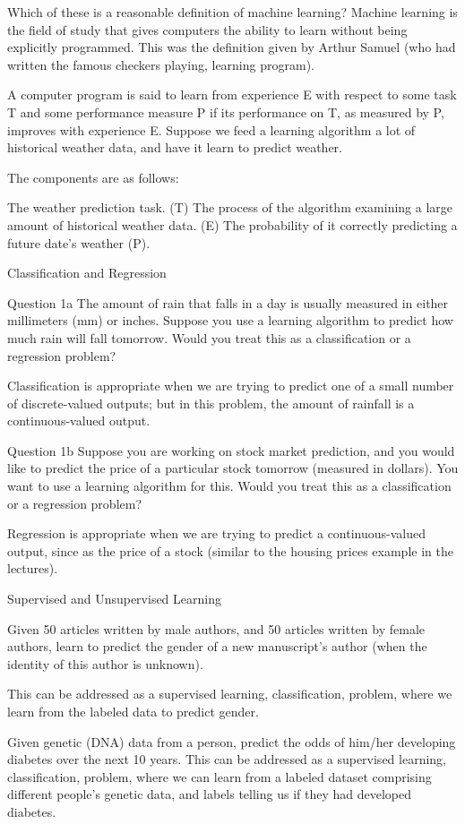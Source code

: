 Which of these is a reasonable definition of machine learning?
Machine learning is the field of study that gives computers the ability to learn without being explicitly programmed.
 This was the definition given by Arthur Samuel (who had written the famous checkers playing, learning program).

A computer program is said to learn from experience E with respect to some task T and some performance measure P if its performance on T, as measured by P, improves with experience E. Suppose we feed a learning algorithm a lot of historical weather data, and have it learn to predict weather. 

The components are as follows: 

The weather prediction task. (T)
The process of the algorithm examining a large amount of historical weather data. (E)
The probability of it correctly predicting a future date's weather (P).


Classification and Regression

Question 1a
The amount of rain that falls in a day is usually measured in either millimeters (mm) or inches. Suppose you use a learning algorithm to predict how much rain will fall tomorrow. Would you treat this as a classification or a regression problem?

Classification is appropriate when we are trying to predict one of a small number of discrete-valued outputs; but in this problem, the amount of rainfall is a continuous-valued output.


Question 1b
Suppose you are working on stock market prediction, and you would like to predict the price of a particular stock tomorrow (measured in dollars). You want to use a learning algorithm for this. Would you treat this as a classification or a regression problem?


Regression is appropriate when we are trying to predict a continuous-valued output, since as the price of a stock (similar to the housing prices example in the lectures).


Supervised and Unsupervised Learning

Given 50 articles written by male authors, and 50 articles written by female authors, learn to predict the gender of a new manuscript's author (when the identity of this author is unknown).

This can be addressed as a supervised learning, classification, problem, where we learn from the labeled data to predict gender.

Given genetic (DNA) data from a person, predict the odds of him/her developing diabetes over the next 10 years.	
This can be addressed as a supervised learning, classification, problem, where we can learn from a labeled dataset comprising different people's genetic data, and labels telling us if they had developed diabetes.


